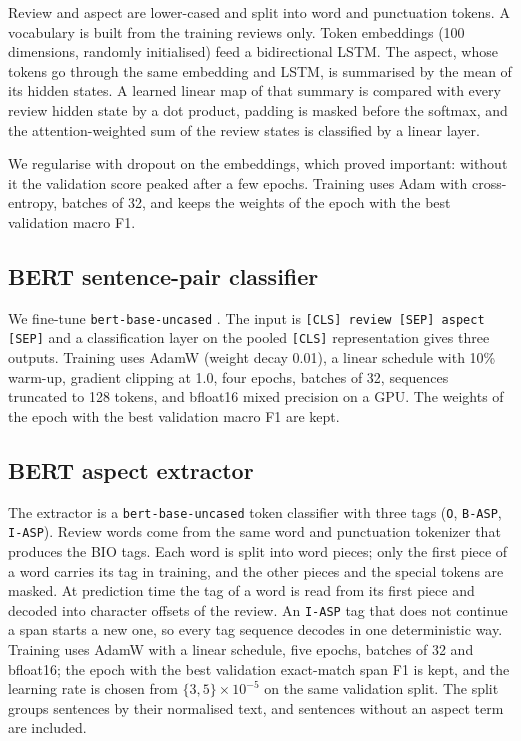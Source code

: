 \documentclass{nle}
\begin{document}
Review and aspect are lower-cased and split into word and punctuation tokens. A vocabulary is built from the training reviews only. Token embeddings (100 dimensions, randomly initialised) feed a bidirectional LSTM. The aspect, whose tokens go through the same embedding and LSTM, is summarised by the mean of its hidden states. A learned linear map of that summary is compared with every review hidden state by a dot product, padding is masked before the softmax, and the attention-weighted sum of the review states is classified by a linear layer.

We regularise with dropout on the embeddings, which proved important: without it the validation score peaked after a few epochs. Training uses Adam with cross-entropy, batches of 32, and keeps the weights of the epoch with the best validation macro F1.

\subsection{BERT sentence-pair classifier}

We fine-tune \texttt{bert-base-uncased} \cite{devlin2019}. The input is \texttt{[CLS] review [SEP] aspect [SEP]} and a classification layer on the pooled \texttt{[CLS]} representation gives three outputs. Training uses AdamW (weight decay 0.01), a linear schedule with 10\% warm-up, gradient clipping at 1.0, four epochs, batches of 32, sequences truncated to 128 tokens, and bfloat16 mixed precision on a GPU. The weights of the epoch with the best validation macro F1 are kept.

\subsection{BERT aspect extractor}

The extractor is a \texttt{bert-base-uncased} token classifier with three tags (\texttt{O}, \texttt{B-ASP}, \texttt{I-ASP}). Review words come from the same word and punctuation tokenizer that produces the BIO tags. Each word is split into word pieces; only the first piece of a word carries its tag in training, and the other pieces and the special tokens are masked. At prediction time the tag of a word is read from its first piece and decoded into character offsets of the review. An \texttt{I-ASP} tag that does not continue a span starts a new one, so every tag sequence decodes in one deterministic way. Training uses AdamW with a linear schedule, five epochs, batches of 32 and bfloat16; the epoch with the best validation exact-match span F1 is kept, and the learning rate is chosen from $\{3, 5\}\times10^{-5}$ on the same validation split. The split groups sentences by their normalised text, and sentences without an aspect term are included.
\end{document}
